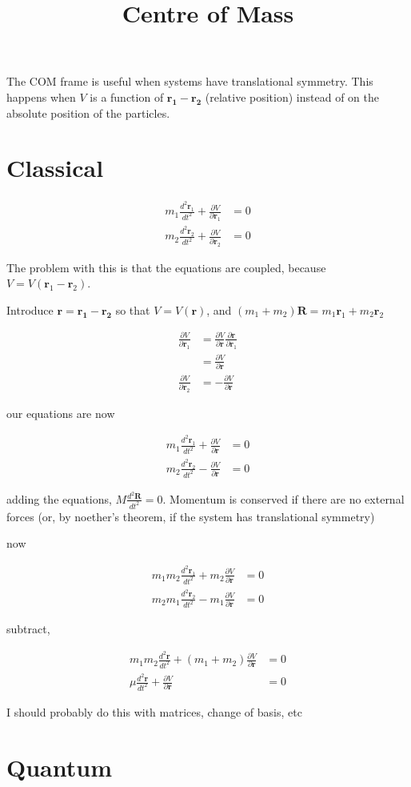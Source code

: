 \documentclass{article}
\title{Centre of Mass}
\date{}
\newcommand{\mb}{\mathbf}
\begin{document}
\maketitle

The COM frame is useful when systems have translational symmetry. This happens when $V$ is a function of $\mb{r_1 - r_2}$ (relative position) instead of on the absolute position of the particles.

\section{Classical}

\begin{align}
m_1 \frac{d^2 \mb r_1}{d t^2} + \frac{\partial V}{\partial \mb r_1} &= 0 \\
m_2 \frac{d^2 \mb r_2}{d t^2} + \frac{\partial V}{\partial \mb r_2} &= 0
\end{align}

The problem with this is that the equations are coupled, because $V = V(\mb r_1 - \mb r_2)$.

Introduce $\mb r = \mb{r_1 - r_2}$ so that $V = V(\mb r)$, and $(m_1 + m_2) \mb R = m_1\mb r_1 + m_2\mb r_2$

\begin{align}
\frac{\partial V}{\partial \mb r_1} &= \frac{\partial V}{\partial \mb r} \frac{\partial \mb r}{\partial \mb r_1} \\
&= \frac{\partial V}{\partial \mb r} \\
\frac{\partial V}{\partial \mb r_2} &= -\frac{\partial V}{\partial \mb r}
\end{align}

our equations are now

\begin{align}
m_1 \frac{d^2 \mb r_1}{d t^2} + \frac{\partial V}{\partial \mb r} &= 0 \\
m_2 \frac{d^2 \mb r_2}{d t^2} - \frac{\partial V}{\partial \mb r} &= 0
\end{align}

adding the equations, $M \frac{d^2 \mb R}{d t^2} = 0$. Momentum is conserved if there are no external forces (or, by noether's theorem, if the system has translational symmetry)

now


\begin{align}
m_1 m_2 \frac{d^2 \mb r_1}{d t^2} + m_2 \frac{\partial V}{\partial \mb r} &= 0 \\
m_2 m_1 \frac{d^2 \mb r_2}{d t^2} - m_1 \frac{\partial V}{\partial \mb r} &= 0
\end{align}

subtract,

\begin{align}
m_1 m_2 \frac{d^2 \mb r}{d t^2} + (m_1 + m_2) \frac{\partial V}{\partial \mb r} &= 0 \\
\mu \frac{d^2 \mb r}{d t^2} + \frac{\partial V}{\partial \mb r} &= 0
\end{align}

I should probably do this with matrices, change of basis, etc

\section{Quantum}
\end{document}
